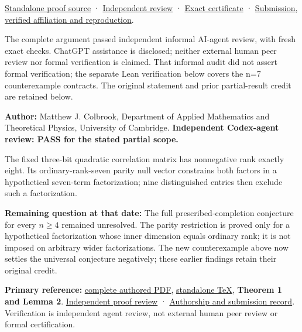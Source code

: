 \documentclass[11pt,a4paper]{article}
\makeatletter
\renewcommand{\subsection}{\Needspace{4\baselineskip}\@startsection{subsection}{2}{0pt}{9pt plus 1pt minus 1pt}{3pt}{\sffamily\bfseries\normalsize\color{ink}}}
\makeatother
\begin{document}
\href{https://github.com/ajt60gaibb/OpenProblemsInNLA/blob/main/references/holden-nr03-2026-09-13/NR03_counterexample.tex}{Standalone
proof source} ·
\href{https://github.com/ajt60gaibb/OpenProblemsInNLA/blob/main/references/holden-nr03-2026-09-13/independent-review.md}{Independent
review} ·
\href{https://github.com/ajt60gaibb/OpenProblemsInNLA/blob/main/references/holden-nr03-2026-09-13/data/factors_n7.json}{Exact
certificate} ·
\href{https://github.com/ajt60gaibb/OpenProblemsInNLA/blob/main/references/holden-nr03-2026-09-13/README.md}{Submission,
verified affiliation and reproduction}.

The complete argument passed independent informal AI-agent review, with
fresh exact checks. ChatGPT assistance is disclosed; neither external
human peer review nor formal verification is claimed. That informal
audit did not assert formal verification; the separate Lean verification
below covers the n=7 counterexample contracts. The original statement
and prior partial-result credit are retained below.

\subsection{Historical partial result ---
2026-09-11}\label{historical-partial-result-2026-09-11}

\textbf{Author:} Matthew J. Colbrook, Department of Applied Mathematics
and Theoretical Physics, University of Cambridge. \textbf{Independent
Codex-agent review: PASS for the stated partial scope.}

The fixed three-bit quadratic correlation matrix has nonnegative rank
exactly eight. Its ordinary-rank-seven parity null vector constrains
both factors in a hypothetical seven-term factorization; nine
distinguished entries then exclude such a factorization.

\textbf{Remaining question at that date:} The full prescribed-completion
conjecture for every \(n\ge4\) remained unresolved. The parity
restriction is proved only for a hypothetical factorization whose inner
dimension equals ordinary rank; it is not imposed on arbitrary wider
factorizations. The new counterexample above now settles the universal
conjecture negatively; these earlier findings retain their original
credit.

\textbf{Primary reference:}
\href{https://github.com/ajt60gaibb/OpenProblemsInNLA/blob/main/references/colbrook-factorization-2026-09-11/manuscripts/NR-03_n3_exact_rank.pdf}{complete
authored PDF},
\href{https://github.com/ajt60gaibb/OpenProblemsInNLA/blob/main/references/colbrook-factorization-2026-09-11/manuscripts/NR-03_n3_exact_rank.tex}{standalone
TeX}, \textbf{Theorem 1 and Lemma 2}.
\href{https://github.com/ajt60gaibb/OpenProblemsInNLA/blob/main/references/colbrook-factorization-2026-09-11/verification/reviews/NR-03-review.md}{Independent
proof review} ·
\href{https://github.com/ajt60gaibb/OpenProblemsInNLA/blob/main/references/colbrook-factorization-2026-09-11/README.md}{Authorship
and submission record}. Verification is independent agent review, not
external human peer review or formal certification.
\end{document}
